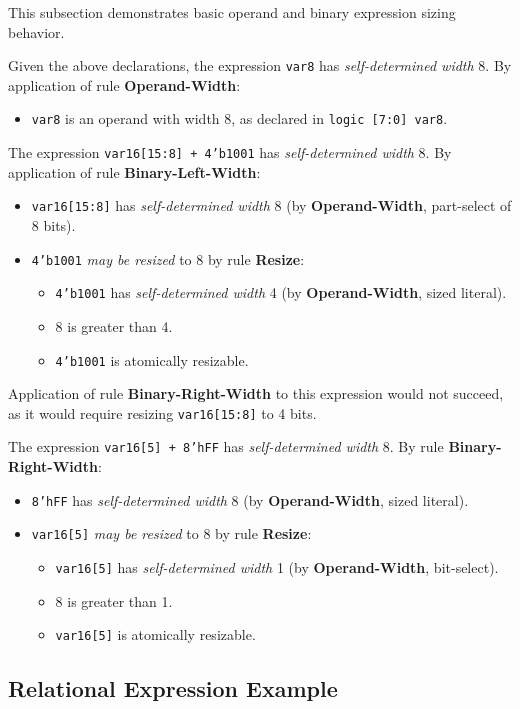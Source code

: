 \documentclass{article}
\newcommand{\sv}[1]{\texttt{#1}}
\newcommand{\sds}{\emph{self-determined width}}
\newcommand{\mbr}{\emph{may be resized}}
\begin{document}
This subsection demonstrates basic operand and binary expression
sizing behavior.

Given the above declarations, the expression \sv{var8} has \sds{} 8.
By application of rule \textbf{Operand-Width}:
\begin{itemize}
  \item \sv{var8} is an operand with width 8, as declared
    in \sv{logic [7:0] var8}.
\end{itemize}

The expression \sv{var16[15:8] + 4'b1001} has \sds{} 8.
By application of rule \textbf{Binary-Left-Width}:
\begin{itemize}
  \item \sv{var16[15:8]} has \sds{} 8 (by
    \textbf{Operand-Width}, part-select of 8 bits).
  \item \sv{4'b1001} \mbr{} to 8 by rule \textbf{Resize}:
    \begin{itemize}
      \item \sv{4'b1001} has \sds{} 4 (by
        \textbf{Operand-Width}, sized literal).
      \item 8 is greater than 4.
      \item \sv{4'b1001} is atomically resizable.
    \end{itemize}
\end{itemize}

Application of rule \textbf{Binary-Right-Width} to this expression
would not succeed, as it would require resizing \sv{var16[15:8]} to
4 bits.

The expression \sv{var16[5] + 8'hFF} has \sds{} 8. By rule
\textbf{Binary-Right-Width}:
\begin{itemize}
  \item \sv{8'hFF} has \sds{} 8 (by \textbf{Operand-Width},
    sized literal).
  \item \sv{var16[5]} \mbr{} to 8 by rule \textbf{Resize}:
    \begin{itemize}
      \item \sv{var16[5]} has \sds{} 1 (by
        \textbf{Operand-Width}, bit-select).
      \item 8 is greater than 1.
      \item \sv{var16[5]} is atomically resizable.
    \end{itemize}
\end{itemize}

\subsection{Relational Expression Example}
\end{document}
